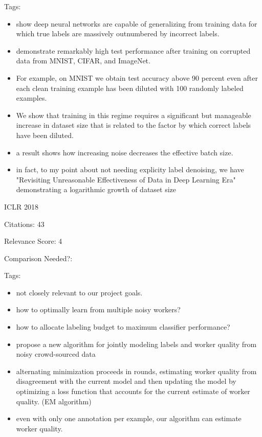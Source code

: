 \documentclass[11pt]{article}
\begin{document}
\noindent Tags:

\begin{itemize}
\item show deep neural networks are capable of generalizing from training data for which true labels are massively outnumbered by incorrect labels.
\item demonstrate remarkably high test performance after training on corrupted data from MNIST, CIFAR, and ImageNet.
\item For example, on MNIST we obtain test accuracy above 90 percent even after each clean training example has been diluted with 100 randomly labeled examples.
\item We show that training in this regime requires a significant but manageable increase in dataset size that is related to the factor by which correct labels have been diluted.
\item a result shows how increasing noise decreases the effective batch size.
\item in fact, to my point about not needing explicity label denoising, we have "Revisiting Unreasonable Effectiveness of Data in Deep Learning Era" demonstrating a logarithmic growth of dataset size
\end{itemize}

\vspace{2cm}

\noindent ICLR 2018

\noindent Citations: 43

\noindent Relevance Score: 4

\noindent Comparison Needed?: 

\noindent Tags:

\begin{itemize}
\item not closely relevant to our project goals.
\item how to optimally learn from multiple noisy workers?
\item how to allocate labeling budget to maximum classifier performance?
\item propose a new algorithm for jointly modeling labels and worker quality from noisy crowd-sourced data
\item alternating minimization proceeds in rounds, estimating worker quality from disagreement with the current model and then updating the model by optimizing a loss function that accounts for the current estimate of worker quality. (EM algorithm)
\item even with only one annotation per example, our algorithm can estimate worker quality.
\end{itemize}
\end{document}
